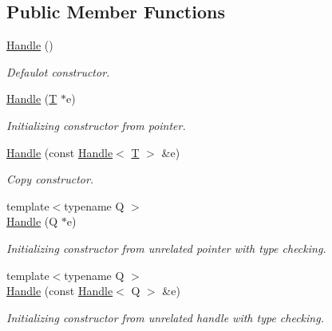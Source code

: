 \subsection*{Public Member Functions}
\begin{DoxyCompactItemize}
\item 
\hyperlink{class_d_d4hep_1_1_handle_a97b64b3f6c35305e77fe00bc2f73aeb7}{Handle} ()
\begin{DoxyCompactList}\small\item\em Defaulot constructor. \item\end{DoxyCompactList}\item 
\hyperlink{class_d_d4hep_1_1_handle_aae5fd1b909826186406e57e41679ab8d}{Handle} (\hyperlink{class_t}{T} $\ast$e)
\begin{DoxyCompactList}\small\item\em Initializing constructor from pointer. \item\end{DoxyCompactList}\item 
\hyperlink{class_d_d4hep_1_1_handle_ae0d7f77a5c4bb5dd1662c694f59eee6e}{Handle} (const \hyperlink{class_d_d4hep_1_1_handle}{Handle}$<$ \hyperlink{class_t}{T} $>$ \&e)
\begin{DoxyCompactList}\small\item\em Copy constructor. \item\end{DoxyCompactList}\item 
{\footnotesize template$<$typename Q $>$ }\\\hyperlink{class_d_d4hep_1_1_handle_a3e6a892a565350ab440205c4ec2e06f8}{Handle} (Q $\ast$e)
\begin{DoxyCompactList}\small\item\em Initializing constructor from unrelated pointer with type checking. \item\end{DoxyCompactList}\item 
{\footnotesize template$<$typename Q $>$ }\\\hyperlink{class_d_d4hep_1_1_handle_a992ea44be93dc5e115007c052b0044f8}{Handle} (const \hyperlink{class_d_d4hep_1_1_handle}{Handle}$<$ Q $>$ \&e)
\begin{DoxyCompactList}\small\item\em Initializing constructor from unrelated handle with type checking. \item\end{DoxyCompactList}\item 

\end{DoxyCompactItemize}
